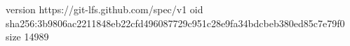 version https://git-lfs.github.com/spec/v1
oid sha256:3b9806ac2211848eb22cfd496087729c951c28e9fa34bdcbeb380ed85c7e79f0
size 14989
